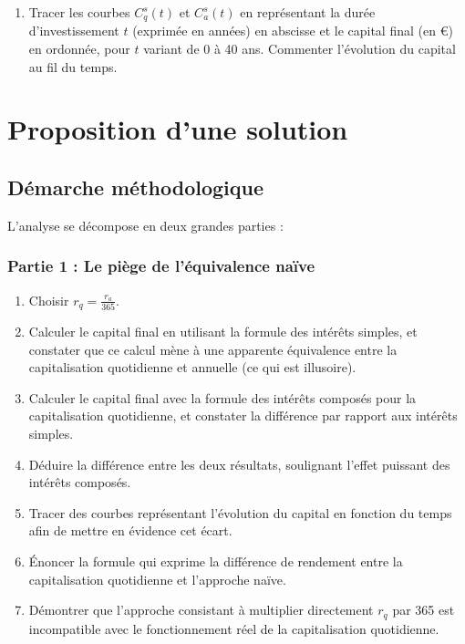 \documentclass{article}
\begin{document}
\begin{enumerate}[label=\textbf{Q\arabic*.}]
    \item Tracer les courbes \( C^s_q(t) \) et \( C^s_a(t) \) en représentant la durée d'investissement \( t \) (exprimée en années) en abscisse et le capital final (en €) en ordonnée, pour \( t \) variant de 0 à 40 ans. Commenter l'évolution du capital au fil du temps.

\end{enumerate}

\section{Proposition d'une solution}
\subsection{Démarche méthodologique}
L'analyse se décompose en deux grandes parties :

\subsubsection*{Partie 1 : Le piège de l'équivalence naïve}
\begin{enumerate}
    \item Choisir \( r_q = \frac{r_a}{365} \).
    \item Calculer le capital final en utilisant la formule des intérêts simples, et constater que ce calcul mène à une apparente équivalence entre la capitalisation quotidienne et annuelle (ce qui est illusoire).
    \item Calculer le capital final avec la formule des intérêts composés pour la capitalisation quotidienne, et constater la différence par rapport aux intérêts simples.
    \item Déduire la différence entre les deux résultats, soulignant l'effet puissant des intérêts composés.
    \item Tracer des courbes représentant l'évolution du capital en fonction du temps afin de mettre en évidence cet écart.
    \item Énoncer la formule qui exprime la différence de rendement entre la capitalisation quotidienne et l'approche naïve.
    \item Démontrer que l'approche consistant à multiplier directement \( r_q \) par 365 est incompatible avec le fonctionnement réel de la capitalisation quotidienne. %
\end{enumerate}
\end{document}
